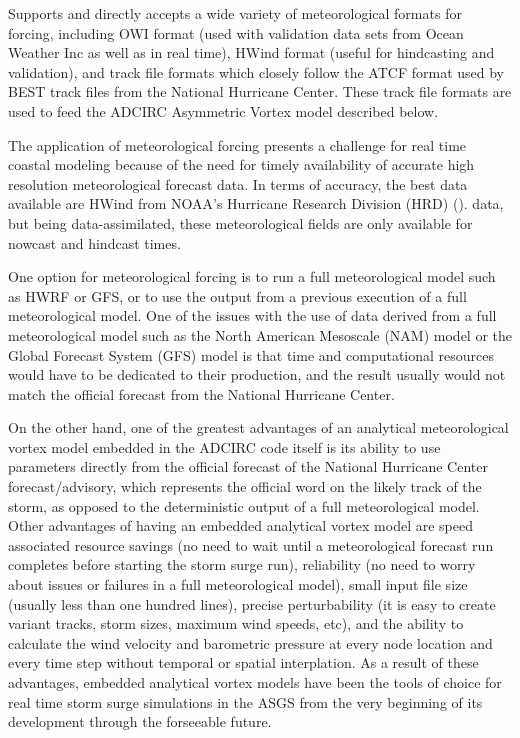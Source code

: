 \documentclass[jmse,article,submit,moreauthors,pdftex,12pt,a4paper]{mdpi}
\begin{document}
Supports and directly accepts a wide variety of meteorological 
formats for forcing, including OWI format (used with validation data 
sets from Ocean Weather Inc as well as in real time), HWind format 
(useful for hindcasting and validation), and track file formats which
closely follow the ATCF format used by BEST track files from the 
National Hurricane Center. These track file formats are used to feed
the ADCIRC Asymmetric Vortex model described below. 

The application of meteorological forcing presents a challenge for 
real time coastal modeling because of the need for timely 
availability of accurate high resolution meteorological forecast 
data. In terms of accuracy, the best data available are HWind from 
NOAA's Hurricane Research Division (HRD) (\cite{PowellMD1998}). 
data, but being data-assimilated, these meteorological fields are 
only available for nowcast and hindcast times.

One option for meteorological forcing is to run a full 
meteorological model such as HWRF or GFS, or to use the output from 
a previous execution of a full meteorological model. One of the 
issues with the use of data derived from a full meteorological model 
such as the North American Mesoscale (NAM) model or the Global 
Forecast System (GFS) model is that time and computational resources 
would have to be dedicated to their production, and the result 
usually would not match the official forecast from the National 
Hurricane Center. 

On the other hand, one of the greatest advantages of an analytical 
meteorological vortex model embedded in the ADCIRC code itself is 
its ability to use parameters directly from the official forecast of 
the National Hurricane Center forecast/advisory, which represents 
the official word on the likely track of the storm, as opposed to 
the deterministic output of a full meteorological model. Other 
advantages of having an embedded analytical vortex model are speed 
associated resource savings (no need to wait until a meteorological 
forecast run completes before starting the storm surge run), 
reliability (no need to worry about issues or failures in a full 
meteorological model), small input file size (usually less than one 
hundred lines), precise perturbability (it is easy to create variant 
tracks, storm sizes, maximum wind speeds, etc), and the ability to 
calculate the wind velocity and barometric pressure at every node 
location and every time step without temporal or spatial 
interplation. As a result of these advantages, embedded analytical 
vortex models have been the tools of choice for real time storm 
surge simulations in the ASGS from the very beginning of its 
development through the forseeable future.  
\end{document}
